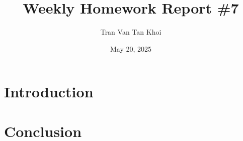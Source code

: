 \documentclass{article}
\author{Tran Van Tan Khoi}
\date{May 20, 2025}
\title{Weekly Homework Report \#7}
\begin{document}
\maketitle

\section{Introduction}
\label{introduction}





\section{Conclusion}
\label{conclusion}
\end{document}
